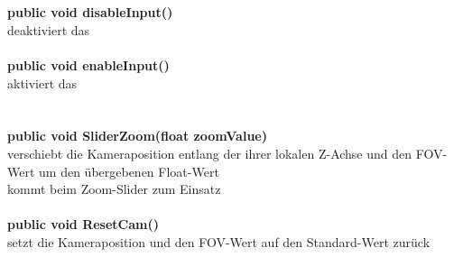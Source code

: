 \section{\srs}
%
\textbf{public void disableInput()}\\
deaktiviert das \srs\\
\\
\textbf{public void enableInput()}\\
aktiviert das \srs\\
%
\section{\zcs}
%
\textbf{public void SliderZoom(float zoomValue)}\\
verschiebt die Kameraposition entlang der ihrer lokalen Z-Achse und den FOV-Wert um den übergebenen Float-Wert\\
kommt beim Zoom-Slider zum Einsatz\\
\\
\textbf{public void ResetCam()}\\
setzt die Kameraposition und den FOV-Wert auf den Standard-Wert zurück
%